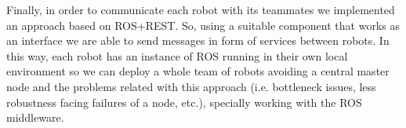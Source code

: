 Finally, in order to communicate each robot with its teammates we implemented an approach based on ROS+REST.
So, using a suitable component that works as an interface we are able to send messages in form of services between robots.
In this way, each robot has an instance of ROS running in their own local environment so we can deploy a whole team of robots avoiding a central master node and the problems related with this approach (i.e. bottleneck issues, less robustness facing failures of a node, etc.), specially working with the ROS middleware.

